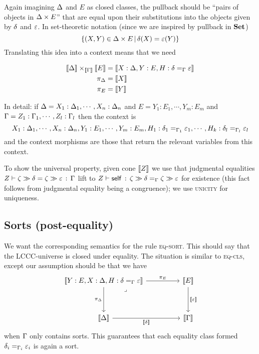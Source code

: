 Again imagining $\Delta$ and $E$ as closed classes,
the pullback should be ``pairs of objects in $\Delta \times E$'' that
are equal upon their substitutions into the objects given by $\delta$ and $\varepsilon$.
In set-theoretic notation (since we are inspired by pullback in $\mathbf{Set}$)
\[ \left\{ (X,Y) \in \Delta \times E \,|\, \delta(X) = \varepsilon(Y) \right\}\]
Translating this idea into a context means that we need

\begin{align*}
  {\llbracket \Delta\rrbracket \times_{\llbracket \Gamma\rrbracket} \llbracket E \rrbracket} & = \llbracket X : \Delta, Y : E, H : \delta =_{\Gamma} \varepsilon \rrbracket\\
  \pi_{\Delta} & = \llbracket  X  \rrbracket \\
  \pi_{E} & = \llbracket  Y  \rrbracket
\end{align*}

In detail: if $\Delta = X_{1} : \Delta_{1}, \cdots , X_{n} : \Delta_{n}$
and $E = Y_{1} : E_{1}, \cdots, Y_{m} : E_{m}$
and $\Gamma = Z_{1} : \Gamma_{1}, \cdots , Z_{l} : \Gamma_{l}$
then the context is
\[X_{1} : \Delta_{1}, \cdots , X_{n} : \Delta_{n}, Y_{1} : E_{1}, \cdots, Y_{m} : E_{m} ,
  H_{1} : \delta_{1} =_{\Gamma_{1}} \varepsilon_{1}, \cdots , H_{k} : \delta_{l} =_{\Gamma_{l}} \varepsilon_{l}\]
and the context morphisms are those that return the relevant variables from this context.

To show the universal property, given cone $\llbracket Z \rrbracket$
we use that judgmental equalities
$Z \vdash \zeta \gg \delta = \zeta \gg \varepsilon \, : \, \Gamma$
lift
to $Z \vdash \mathsf{self} \, : \, \zeta \gg \delta =_{\Gamma} \zeta \gg \varepsilon$ for existence
(this fact follows from judgmental equality being a congruence);
we use \textsc{unicity} for uniqueness.

\begin{multicols}{2}


\end{multicols}

\subsection{Sorts (post-equality)}
We want the corresponding semantics for the rule \textsc{eq-sort}.
This should say that the LCCC-universe is closed under equality.
The situation is similar to \textsc{eq-cls},
except our assumption should be that we have
\[\begin{tikzcd}
  {\bbrkt{Y : E, X : \De, H : \EqCS{\Ga}{\de}{\ep}}} && \bbrkt{E} \\
  \\
  \bbrkt{\De} && \bbrkt{\Ga}
  \arrow["\pi_{E}", from=1-1, to=1-3]
  \arrow["\bbrkt{\de}"', from=3-1, to=3-3]
  \arrow["\bbrkt{\ep}", from=1-3, to=3-3]
  \arrow["\pi_{\De}"', from=1-1, to=3-1]
  \arrow["\lrcorner"{anchor=center, pos=0.125}, draw=none, from=1-1, to=3-3]
\end{tikzcd}\]
when $\Gamma$ only contains sorts.
This guarantees that each equality class formed $\delta_{i} =_{\Gamma_{i}} \varepsilon_{i}$
is again a sort.

